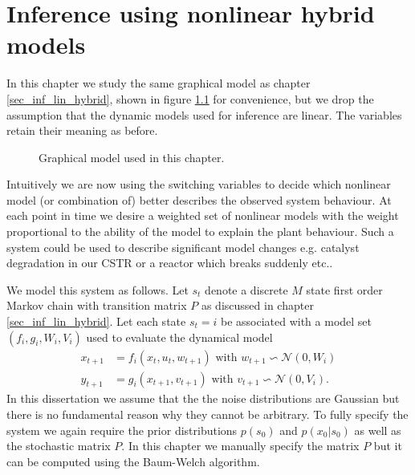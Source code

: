 \chapter{Inference using nonlinear hybrid models}
\label{sec_inf_spf}
In this chapter we study the same graphical model as chapter \ref{sec_inf_lin_hybrid}, shown in figure \ref{fig_hybridmod2} for convenience, but we drop the assumption that the dynamic models used for inference are linear. The variables retain their meaning as before.     
\begin{figure}[H] 
\centering
{}
\caption{Graphical model used in this chapter.}
\label{fig_hybridmod2}
\end{figure}
Intuitively we are now using the switching variables to decide which nonlinear model (or combination of) better describes the observed system behaviour. At each point in time we desire a weighted set of nonlinear models with the weight proportional to the ability of the model to explain the plant behaviour. Such a system could be used to describe significant model changes e.g. catalyst degradation in our CSTR or a reactor which breaks suddenly etc..

We model this system as follows. Let $s_t$ denote a discrete $M$ state first order Markov chain with transition matrix $P$ as discussed in chapter \ref{sec_inf_lin_hybrid}. Let each state $s_t=i$ be associated with a model set $\left(f_i, g_i, W_i, V_i \right)$ used to evaluate the dynamical model
\begin{equation}
\begin{aligned}
x_{t+1} &= f_i(x_t, u_t, w_{t+1}) \text{ with } w_{t+1} \backsim \mathcal{N}(0, W_i)\\
y_{t+1} &= g_i(x_{t+1}, v_{t+1}) \text{ with } v_{t+1} \backsim \mathcal{N}(0,V_i).
\end{aligned}
\label{eq_smodel2}
\end{equation}
In this dissertation we assume that the the noise distributions are Gaussian but there is no fundamental reason why they cannot be arbitrary. To fully specify the system we again require the prior distributions $p(s_0)$ and $p(x_0|s_0)$ as well as the stochastic matrix $P$. In this chapter we manually specify the matrix $P$ but it can be computed using the Baum-Welch algorithm. 
